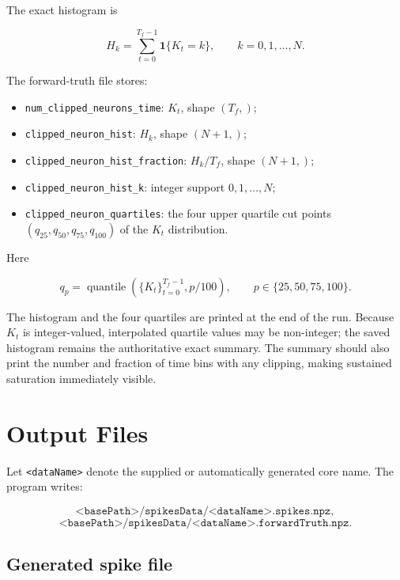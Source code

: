 \documentclass[11pt]{article}
\begin{document}
The exact histogram is

\begin{equation}
\label{eq:clip-hist}
H_k=\sum_{t=0}^{T_f-1}\mathbf{1}\{K_t=k\},
\qquad k=0,1,\ldots,N.
\end{equation}

The forward-truth file stores:
\begin{itemize}
  \item \texttt{num\_clipped\_neurons\_time}: \(K_t\), shape \((T_f,)\);
  \item \texttt{clipped\_neuron\_hist}: \(H_k\), shape \((N+1,)\);
  \item \texttt{clipped\_neuron\_hist\_fraction}:
        \(H_k/T_f\), shape \((N+1,)\);
  \item \texttt{clipped\_neuron\_hist\_k}: integer support
        \(0,1,\ldots,N\);
  \item \texttt{clipped\_neuron\_quartiles}: the four upper quartile
        cut points
        \((q_{25},q_{50},q_{75},q_{100})\) of the \(K_t\) distribution.
\end{itemize}

Here

\[
q_p=\operatorname{quantile}\left(\{K_t\}_{t=0}^{T_f-1},p/100\right),
\qquad p\in\{25,50,75,100\}.
\]

The histogram and the four quartiles are printed at the end of the run.
Because \(K_t\) is integer-valued, interpolated quartile values may be
non-integer; the saved histogram remains the authoritative exact summary.
The summary should also print the number and fraction of time bins with
any clipping, making sustained saturation immediately visible.

\section{Output Files}
\label{sec:outputs}

Let \texttt{<dataName>} denote the supplied or automatically generated core
name. The program writes:

\[
\texttt{<basePath>/spikesData/<dataName>.spikes.npz},
\]
\[
\texttt{<basePath>/spikesData/<dataName>.forwardTruth.npz}.
\]

\subsection{Generated spike file}
\end{document}
